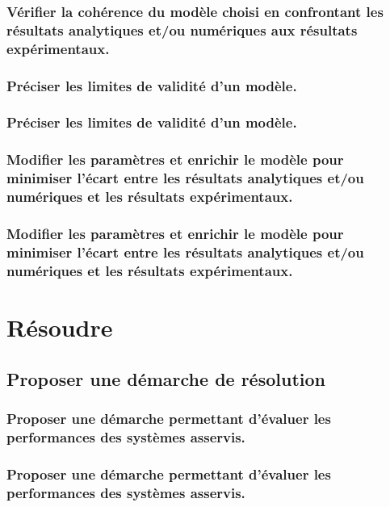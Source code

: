 \documentclass[10pt,fleqn]{book}
\begin{document}
\subsection{Vérifier la cohérence du modèle choisi en confrontant les résultats analytiques et/ou numériques aux résultats expérimentaux.} 

\subsection{Préciser les limites de validité d'un modèle.} 

\subsection{Préciser les limites de validité d'un modèle.} 

\subsection{Modifier les paramètres et enrichir le modèle pour minimiser l’écart entre les résultats analytiques et/ou numériques et les résultats expérimentaux.} 

\subsection{Modifier les paramètres et enrichir le modèle pour minimiser l’écart entre les résultats analytiques et/ou numériques et les résultats expérimentaux.} 

\chapter{Résoudre} 

\section{Proposer une démarche de résolution} 

\subsection{Proposer une démarche permettant d'évaluer les performances des systèmes asservis.} 

\subsection{Proposer une démarche permettant d'évaluer les performances des systèmes asservis.} 
\end{document}
